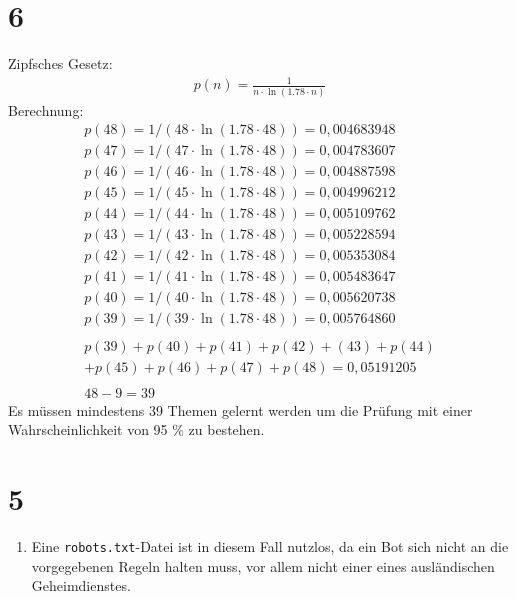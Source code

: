 \documentclass[ngerman]{scrartcl}
\begin{document}
\section*{6}
	Zipfsches Gesetz:
	\begin{align*}
		p(n) = \frac{1}{n \cdot \ln(1.78 \cdot n) }
	\end{align*}
	Berechnung:
	\begin{align*}
	p(48) = 1/(48 \cdot \ln(1.78 \cdot 48)) = 0,004683948 \\
	p(47) = 1/(47 \cdot \ln(1.78 \cdot 48)) = 0,004783607 \\
	p(46) = 1/(46 \cdot \ln(1.78 \cdot 48)) = 0,004887598 \\
	p(45) = 1/(45 \cdot \ln(1.78 \cdot 48)) = 0,004996212 \\
	p(44) = 1/(44 \cdot \ln(1.78 \cdot 48)) = 0,005109762 \\
	p(43) = 1/(43 \cdot \ln(1.78 \cdot 48)) = 0,005228594 \\
	p(42) = 1/(42 \cdot \ln(1.78 \cdot 48)) = 0,005353084 \\
	p(41) = 1/(41 \cdot \ln(1.78 \cdot 48)) = 0,005483647 \\
	p(40) = 1/(40 \cdot \ln(1.78 \cdot 48)) = 0,005620738 \\
	p(39) = 1/(39 \cdot \ln(1.78 \cdot 48)) = 0,005764860  \\
	\\
	p(39)+p(40)+p(41)+p(42)+(43)+p(44) \\
	+p(45)+p(46)+p(47)+p(48) = 0,05191205 \\
	\\
	48 - 9 = 39	
	\end{align*}
	Es müssen mindestens 39 Themen gelernt werden um die Prüfung mit einer Wahrscheinlichkeit von 95 \% zu bestehen.

\section*{5}
  \begin{enumerate}[label=\alph*)]
    \addtocounter{enumi}{1}
    \item
    Eine \texttt{robots.txt}-Datei ist in diesem Fall nutzlos,
    da ein Bot sich nicht an die vorgegebenen Regeln halten muss,
    vor allem nicht einer eines ausländischen Geheimdienstes.
  \end{enumerate}
\end{document}
